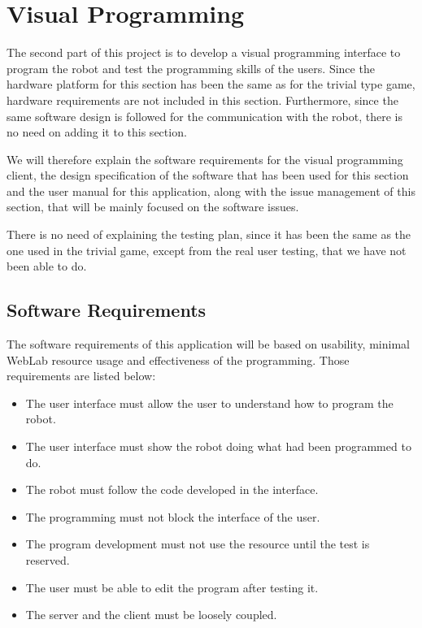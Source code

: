 \clearpage
\section{Visual Programming}

The second part of this project is to develop a visual programming interface to program the robot
and test the programming skills of the users. Since the hardware platform for this section has been
the same as for the trivial type game, hardware requirements are not included in this section.
Furthermore, since the same software design is followed for the communication with the robot, there
is no need on adding it to this section.

We will therefore explain the software requirements for the visual programming client, the design
specification of the software that has been used for this section and the user manual for this
application, along with the issue management of this section, that will be mainly focused on the
software issues.

There is no need of explaining the testing plan, since it has been the same as the one used in the
trivial game, except from the real user testing, that we have not been able to do.

\subsection{Software Requirements}

The software requirements of this application will be based on usability, minimal WebLab resource
usage and effectiveness of the programming. Those requirements are listed below:

\begin{itemize}

	\item The user interface must allow the user to understand how to program the robot.
	\item The user interface must show the robot doing what had been programmed to do.
	\item The robot must follow the code developed in the interface.
	\item The programming must not block the interface of the user.
	\item The program development must not use the resource until the test is reserved.
	\item The user must be able to edit the program after testing it.
	\item The server and the client must be loosely coupled.

\end{itemize}

